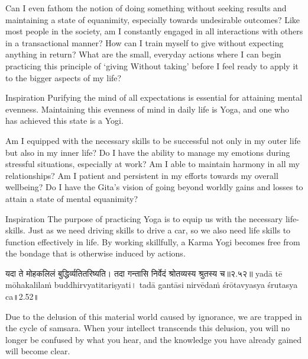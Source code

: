 \newpage
\begin{mananam}{}
\mananamtext Can I even fathom the notion of doing something without seeking results and maintaining a state of equanimity, especially towards undesirable outcomes? Like most people in the society, am I constantly engaged in all interactions with others in a transactional manner? How can I train myself to give without expecting anything in return? What are the small, everyday actions where I can begin practicing this principle of ‘giving Without taking’ before I feel ready to apply it to the bigger aspects of my life? 
\end{mananam}
\WritingHand{}
\begin{inspiration}{\mananamfont Inspiration}
\mananamtext Purifying the mind of all expectations is essential for attaining mental evenness. Maintaining this evenness of mind in daily life is Yoga, and one who has achieved this state is a Yogi.
\end{inspiration}
\newpage

\newpage
\begin{mananam}{}
\mananamtext Am I equipped with the necessary skills to be successful not only in my outer life but also in my inner life? Do I have the ability to manage my emotions during stressful situations, especially at work? Am I able to maintain harmony in all my relationships? Am I patient and persistent in my efforts towards my overall wellbeing? Do I have the Gita’s vision of going beyond worldly gains and losses to attain a state of mental equanimity?
\end{mananam}
\WritingHand{}
\begin{inspiration}{\mananamfont Inspiration}
\mananamtext The purpose of practicing Yoga is to equip us with the necessary life-skills. Just as we need driving skills to drive a car, so we also need life skills to function effectively in life. By working skillfully, a Karma Yogi becomes free from the bondage that is otherwise induced by actions.
\end{inspiration}
\newpage




यदा ते मोहकलिलं बुद्धिर्व्यतितरिष्यति। 
तदा गन्तासि निर्वेदं श्रोतव्यस्य श्रुतस्य च॥२.५२॥
yadā tē mōhakalilaṁ buddhirvyatitariṣyati। 
tadā gantāsi nirvēdaṁ śrōtavyasya śrutasya ca॥2.52॥

Due to the delusion of this material world caused by ignorance, we are trapped in the cycle of  samsara. When your intellect transcends this delusion, you will no longer be confused by what you hear, and the knowledge you have already gained will become clear. 


